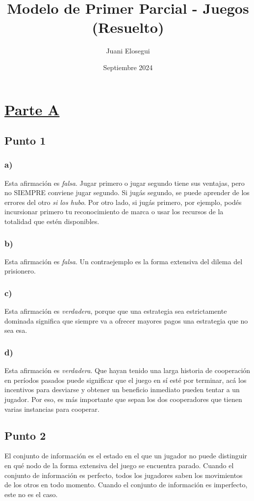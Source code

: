 \documentclass{article}
\title{Modelo de Primer Parcial - Juegos (Resuelto)}
\author{Juani Elosegui}
\date{Septiembre 2024}
\begin{document}
    \maketitle

    \section*{\underline{Parte A}}
        \subsection*{Punto 1}
            \subsubsection*{a)}
                Esta afirmación es \emph{falsa}. Jugar primero o jugar segundo tiene sus ventajas, pero no SIEMPRE conviene jugar segundo. Si jugás segundo, se puede aprender de los errores del otro \emph{si los hubo}. Por otro lado, si jugás primero, por ejemplo, podés incursionar primero tu reconocimiento de marca o usar los recursos de la totalidad que estén disponibles.
            \subsubsection*{b)}
                Esta afirmación es \emph{falsa}. Un contraejemplo es la forma extensiva del dilema del prisionero.
            \subsubsection*{c)}
                Esta afirmación es \emph{verdadera}, porque que una estrategia sea estrictamente dominada significa que siempre va a ofrecer mayores pagos una estrategia que no sea esa.
            \subsubsection*{d)}
                Esta afirmación es \emph{verdadera}. Que hayan tenido una larga historia de cooperación en períodos pasados puede significar que el juego en sí esté por terminar, acá los incentivos para desviarse y obtener un beneficio inmediato pueden tentar a un jugador. Por eso, es más importante que sepan los dos cooperadores que tienen varias instancias para cooperar.
        \subsection*{Punto 2}
            El conjunto de información es el estado en el que un jugador no puede distinguir en qué nodo de la forma extensiva del juego se encuentra parado. Cuando el conjunto de información es perfecto, todos los jugadores saben los movimientos de los otros en todo momento. Cuando el conjunto de información es imperfecto, este no es el caso.
\end{document}
